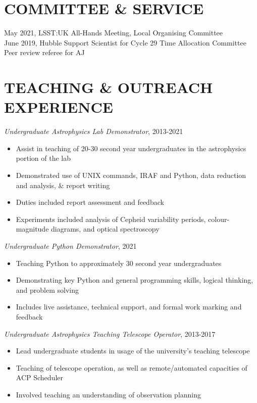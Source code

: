 \documentclass[letter, margin, 10pt]{res} %
\begin{document}
\begin{resume}
\section{COMMITTEE \& SERVICE}

May 2021, LSST:UK All-Hands Meeting, Local Organising Committee\\
June 2019, Hubble Support Scientist for Cycle 29 Time Allocation Committee\\
Peer review referee for AJ\\

 \vspace{-6pt}
\section{TEACHING \& OUTREACH EXPERIENCE}

{\sl Undergraduate Astrophysics Lab Demonstrator}, 2013-2021
\begin{itemize}[noitemsep,topsep=0pt,parsep=0pt,partopsep=0pt]
\item Assist in teaching of 20-30 second year undergraduates in the astrophysics portion of the lab
\item Demonstrated use of UNIX commands, IRAF and Python, data reduction and analysis, \& report writing
\item Duties included report assessment and feedback
\item Experiments included analysis of Cepheid variability periods, colour-magnitude diagrams, and optical spectroscopy
\end{itemize}

\vspace{-10pt}

{\sl Undergraduate Python Demonstrator}, 2021
\begin{itemize}[noitemsep,topsep=0pt,parsep=0pt,partopsep=0pt]
\item Teaching Python to approximately 30 second year undergraduates
\item Demonstrating key Python and general programming skills, logical thinking, and problem solving
\item Includes live assistance, technical support, and formal work marking and feedback
\end{itemize}

\vspace{-10pt}

{\sl Undergraduate Astrophysics Teaching Telescope Operator}, 2013-2017
\begin{itemize}[noitemsep,topsep=0pt,parsep=0pt,partopsep=0pt]
\item Lead undergraduate students in usage of the university's teaching telescope
\item Teaching of telescope operation, as well as remote/automated capacities of ACP Scheduler
\item Involved teaching an understanding of observation planning
\end{itemize}


\end{resume}
\end{document}
